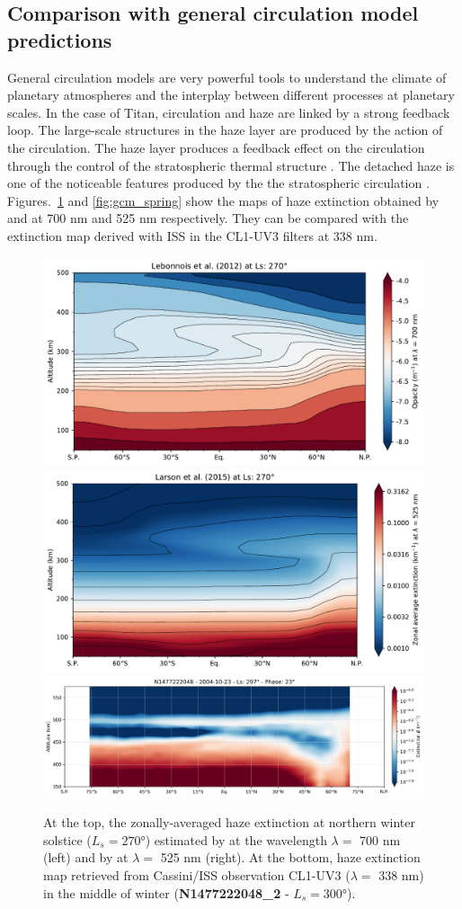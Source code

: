\subsection{Comparison with general circulation model predictions}

General circulation models are very powerful tools to understand the climate of planetary atmospheres and the
interplay between different processes at planetary scales. In the case of Titan, circulation and haze are linked
by a strong feedback loop. The large-scale structures in the haze layer are produced by the action of the
circulation. The haze layer produces a feedback effect on the circulation through the control of the stratospheric
thermal structure \citep{Rannou2004}. The detached haze is one of the noticeable features produced by the the
stratospheric circulation \citep{Rannou2002, Lebonnois2012, Larson2015}. Figures.~\ref{fig:gcm_winter}
and \ref{fig:gcm_spring} show the maps of haze extinction obtained by \cite{Lebonnois2012} and
\cite{Larson2015} at 700 nm and 525 nm respectively. They can be compared with the extinction map derived
with ISS in the CL1-UV3 filters at 338 nm.

\begin{figure}[!ht]
    \centering
    \includegraphics[width=.4\textwidth]{Fig/Lebonnois2012_Fig4_winter}
    \includegraphics[width=.4\textwidth]{Fig/Larson2015-Fig7_Winter}
    \includegraphics[width=.8\textwidth]{Fig/N1477222048_2-lat_beta.png}
    \caption{At the top, the zonally-averaged haze extinction at northern winter solstice
        ($L_s = \ang{270}$) estimated by \cite{Lebonnois2012} at the wavelength $\lambda = $ 700 nm (left)
        and by \cite{Larson2015} at $\lambda = $ 525 nm (right). At the bottom, haze extinction map
        retrieved from Cassini/ISS observation CL1-UV3 ($\lambda = $ 338 nm) in the middle of winter
        (\textbf{N1477222048\_2} - $L_s = \ang{300}$).}
    \label{fig:gcm_winter}
\end{figure}

